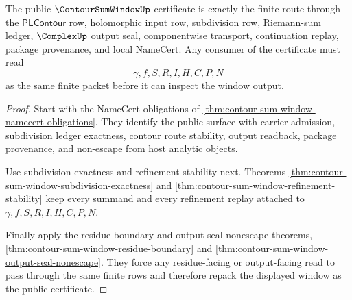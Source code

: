 \begin{theorem}
\label{thm:contoursumwindow-public-certificate}
The public $\ContourSumWindowUp$ certificate is exactly the finite route through
the $\mathsf{PLContour}$ row, holomorphic input row, subdivision row,
Riemann-sum ledger, $\ComplexUp$ output seal, componentwise transport,
continuation replay, package provenance, and local NameCert. Any consumer of
the certificate must read
$$
\gamma,f,S,R,I,H,C,P,N
$$
as the same finite packet before it can inspect the window output.
\end{theorem}
\begin{proof}
Start with the NameCert obligations of
\autoref{thm:contour-sum-window-namecert-obligations}. They identify the public
surface with carrier admission, subdivision ledger exactness, contour route
stability, output readback, package provenance, and non-escape from host
analytic objects.

Use subdivision exactness and refinement stability next. Theorems
\autoref{thm:contour-sum-window-subdivision-exactness} and
\autoref{thm:contour-sum-window-refinement-stability} keep every summand and
every refinement replay attached to $\gamma,f,S,R,I,H,C,P,N$.

Finally apply the residue boundary and output-seal nonescape theorems,
\autoref{thm:contour-sum-window-residue-boundary} and
\autoref{thm:contour-sum-window-output-seal-nonescape}. They force any
residue-facing or output-facing read to pass through the same finite rows and
therefore repack the displayed window as the public certificate.
\end{proof}

